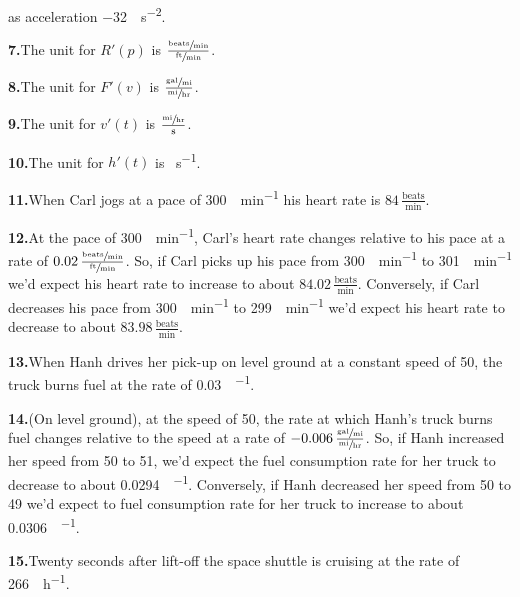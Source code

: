 \documentclass[10pt,oneside,]{book}
\theoremstyle{plain}
\theoremstyle{definition}
\numberwithin{equation}{section}
\newcommand{\fe}[2]{#1\mathopen{}\left(#2\right)\mathclose{}}
\newcommand{\fd}[1]{#1'}
\begin{document}
as acceleration \SI{-32}{\foot\per\second\tothe{2}}.%
\par\smallskip
\noindent\textbf{7.}\quad{}The unit for \(\fe{\fd{R}}{p}\) is \(\frac{\sfrac{\text{beats}}{\text{min}}}{\sfrac{\text{ft}}{\text{min}}}\).%
\par\smallskip
\noindent\textbf{8.}\quad{}The unit for \(\fe{\fd{F}}{v}\) is \(\frac{\sfrac{\text{gal}}{\text{mi}}}{\sfrac{\text{mi}}{\text{hr}}}\).%
\par\smallskip
\noindent\textbf{9.}\quad{}The unit for \(\fe{\fd{v}}{t}\) is \(\frac{\sfrac{\text{mi}}{\text{hr}}}{\text{s}}\).%
\par\smallskip
\noindent\textbf{10.}\quad{}The unit for \(\fe{\fd{h}}{t}\) is \si{\mile\per\second}.%
\par\smallskip
\noindent\textbf{11.}\quad{}When Carl jogs at a pace of \SI{300}{\foot\per\minute} his heart rate is \(84\,\frac{\text{beats}}{\text{min}}\).%
\par\smallskip
\noindent\textbf{12.}\quad{}At the pace of \SI{300}{\foot\per\minute}, Carl's heart rate changes relative to his pace at a rate of \(0.02\,\frac{\sfrac{\text{beats}}{\text{min}}}{\sfrac{\text{ft}}{\text{min}}}\).  So, if Carl picks up his pace from \SI{300}{\foot\per\minute} to \SI{301}{\foot\per\minute} we'd expect his heart rate to increase to about \(84.02\,\frac{\text{beats}}{\text{min}}\).  Conversely, if Carl decreases his pace from \SI{300}{\foot\per\minute} to \SI{299}{\foot\per\minute} we'd expect his heart rate to decrease to about \(83.98\,\frac{\text{beats}}{\text{min}}\).%
\par\smallskip
\noindent\textbf{13.}\quad{}When Hanh drives her pick-up on level ground at a constant speed of \SI{50}{\mileperhour}, the truck burns fuel at the rate of \SI{0.03}{\gallon\per\mile}.%
\par\smallskip
\noindent\textbf{14.}\quad{}(On level ground), at the speed of \SI{50}{\mileperhour}, the rate at which Hanh's truck burns fuel changes relative to the speed at a rate of \(-0.006\,\frac{\sfrac{\text{gal}}{\text{mi}}}{\sfrac{\text{mi}}{\text{hr}}}\).  So, if Hanh increased her speed from \SI{50}{\mileperhour} to \SI{51}{\mileperhour}, we'd expect the fuel consumption rate for her truck to decrease to about \SI{0.0294}{\gallon\per\mile}.  Conversely, if Hanh decreased her speed from \SI{50}{\mileperhour} to \SI{49}{\mileperhour} we'd expect to fuel consumption rate for her truck to increase to about \SI{0.0306}{\gallon\per\mile}.%
\par\smallskip
\noindent\textbf{15.}\quad{}Twenty seconds after lift-off the space shuttle is cruising at the rate of \SI{266}{\mile\per\hour}.%
\end{document}
